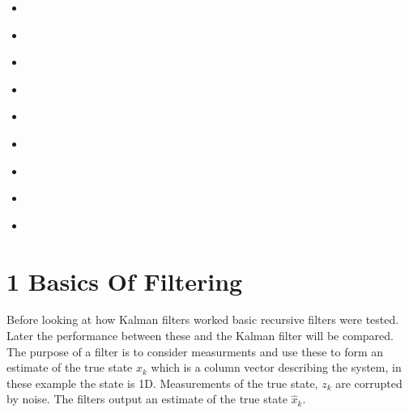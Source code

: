 \documentclass[letterpaper,10pt,english]{jupyterBook}
\begin{document}
\begin{DUlineblock}{0em}
\item[] 
\end{DUlineblock}
\begin{itemize}
\item {} 
\sphinxAtStartPar
{\hyperref[\detokenize{1FilterBasics::doc}]{}}

\item {} 
\sphinxAtStartPar
{\hyperref[\detokenize{2KalmanFilters::doc}]{}}

\item {} 
\sphinxAtStartPar
{\hyperref[\detokenize{3ExampleBatteryOutput::doc}]{}}

\item {} 
\sphinxAtStartPar
{\hyperref[\detokenize{4ExampleVelocityFromPosition::doc}]{}}

\item {} 
\sphinxAtStartPar
{\hyperref[\detokenize{5IMU::doc}]{}}

\item {} 
\sphinxAtStartPar
{\hyperref[\detokenize{6ExtendedKalman::doc}]{}}

\item {} 
\sphinxAtStartPar
{\hyperref[\detokenize{7RealData::doc}]{}}

\item {} 
\sphinxAtStartPar
{\hyperref[\detokenize{8TestingFilters::doc}]{}}

\item {} 
\sphinxAtStartPar
{\hyperref[\detokenize{99Bibliography::doc}]{}}

\end{itemize}

\sphinxstepscope


\chapter{1 Basics Of Filtering}
\label{\detokenize{1FilterBasics:basics-of-filtering}}\label{\detokenize{1FilterBasics::doc}}
\sphinxAtStartPar
Before looking at how Kalman filters worked basic recursive filters were tested. Later the performance between these and the Kalman filter will be compared. The purpose of a filter is to consider measurments and use these to form an estimate of the true state \(x_k\) which is a column vector describing the system, in these example the state is 1D. Measurements of the true state, \(z_k\) are corrupted by noise. The filters output an estimate of the true state \(\hat{x}_k\).
\end{document}
